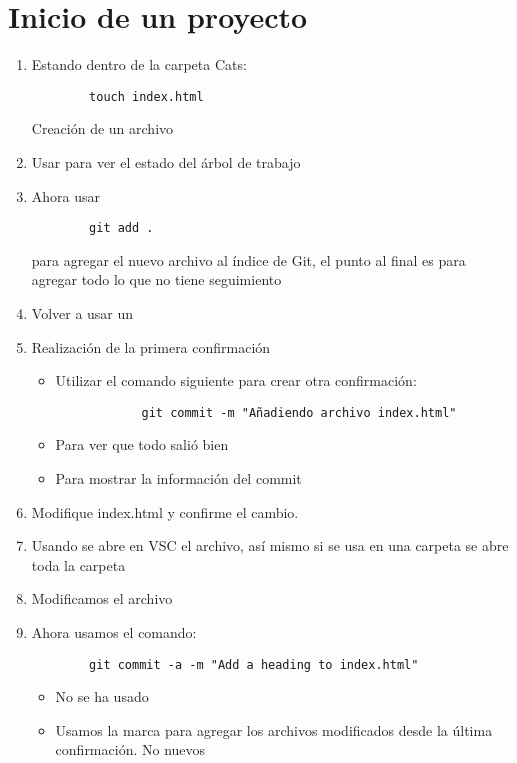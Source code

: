 \section{Inicio de un proyecto}

\begin{enumerate}
    \item Estando dentro de la carpeta Cats:
    \begin{verbatim}
        touch index.html
    \end{verbatim}
    Creación de un archivo
    \item Usar  para ver el estado del árbol de trabajo
    \item Ahora usar 
    \begin{verbatim}
        git add .
    \end{verbatim}
    para agregar el nuevo archivo al índice de Git, el punto al final es para agregar todo lo que no tiene seguimiento
    \item Volver a usar un 
    \item Realización de la primera confirmación
    \begin{itemize}
        \item Utilizar el comando siguiente para crear otra confirmación:
        \begin{verbatim}
            git commit -m "Añadiendo archivo index.html"
        \end{verbatim}
        \item {} Para ver que todo salió bien
        \item {} Para mostrar la información del commit
    \end{itemize}
    \item Modifique index.html y confirme el cambio.
    \item Usando  se abre en VSC el archivo, así mismo si se usa  en una carpeta se abre toda la carpeta
    \item Modificamos el archivo
    \item Ahora usamos el comando:
    \begin{verbatim}
        git commit -a -m "Add a heading to index.html"
    \end{verbatim}
    \begin{itemize}
        \item No se ha usado 
        \item Usamos la marca  para agregar los archivos modificados desde la última confirmación. No nuevos

\end{itemize}
\end{enumerate}
